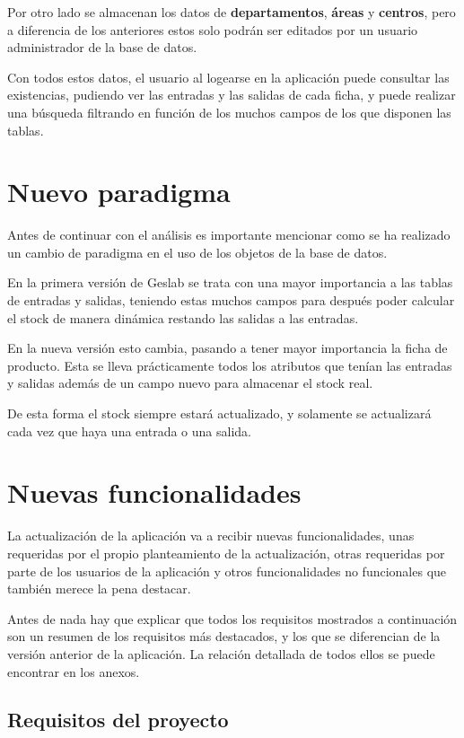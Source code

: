 Por otro lado se almacenan los datos de \textbf{departamentos}, \textbf{áreas} y \textbf{centros}, pero a diferencia de los anteriores estos solo podrán ser editados por un usuario administrador de la base de datos.

Con todos estos datos, el usuario al logearse en la aplicación puede consultar las existencias, pudiendo ver las entradas y las salidas de cada ficha, y puede realizar una búsqueda filtrando en función de los muchos campos de los que disponen las tablas.


\section{Nuevo paradigma}

Antes de continuar con el análisis es importante mencionar como se ha realizado un cambio de paradigma en el uso de los objetos de la base de datos.

En la primera versión de Geslab se trata con una mayor importancia a las tablas de entradas y salidas, teniendo estas muchos campos para después poder calcular el stock de manera dinámica restando las salidas a las entradas. 

En la nueva versión esto cambia, pasando a tener mayor importancia la ficha de producto. Esta se lleva prácticamente todos los atributos que tenían las entradas y salidas además de un campo nuevo para almacenar el stock real.

De esta forma el stock siempre estará actualizado, y solamente se actualizará cada vez que haya una entrada o una salida. 


\section{Nuevas funcionalidades}

La actualización de la aplicación va a recibir nuevas funcionalidades, unas requeridas por el propio planteamiento de la actualización, otras requeridas por parte de los usuarios de la aplicación y otros funcionalidades no funcionales que también merece la pena destacar. 

Antes de nada hay que explicar que todos los requisitos mostrados a continuación son un resumen de los requisitos más destacados, y los que se diferencian de la versión anterior de la aplicación. La relación detallada de todos ellos se puede encontrar en los anexos.

\subsection{Requisitos del proyecto}


